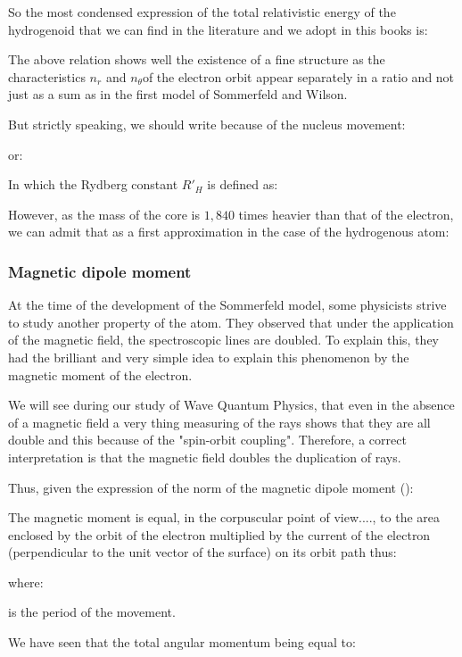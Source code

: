 	So the most condensed expression of the total relativistic energy of the hydrogenoid  that we can find in the literature and we adopt in this books is:
	
	The above relation shows well the existence of a fine structure as the characteristics $n_r$ and $n_\theta$of the electron orbit appear separately in a ratio and not just as a sum as in the first model of Sommerfeld and Wilson.
	
	But strictly speaking, we should write because of the nucleus movement:
	
	or:
	
	In which the Rydberg constant ${R'}_H$ is defined as:
	
	However, as the mass of the core is $1,840$ times heavier than that of the electron, we can admit that as a first approximation in the case of the hydrogenous atom:
	
	
	\pagebreak
	\subsubsection{Magnetic dipole moment}
	At the time of the development of the Sommerfeld model, some physicists strive to study another property of the atom. They observed that under the application of the magnetic field, the spectroscopic lines are doubled. To explain this, they had the brilliant and very simple idea  to explain this phenomenon by the magnetic moment of the electron.
	\begin{tcolorbox}[title=Remark,colframe=black,arc=10pt]
	We will see during our study of Wave Quantum Physics, that even in the absence of a magnetic field a very thing measuring of the rays shows that they are all double and this because of the "spin-orbit coupling". Therefore, a correct interpretation is that the magnetic field doubles the duplication of rays.
	\end{tcolorbox}
	Thus, given the expression of the norm of the magnetic dipole moment ():
	
	The magnetic moment is equal, in the corpuscular point of view...., to the area enclosed by the orbit of the electron multiplied by the current of the electron (perpendicular to the unit vector of the surface) on its orbit path thus:
	
	where:
	
	is the period of the movement.
	
	We have seen that the total angular momentum being equal to:
     
